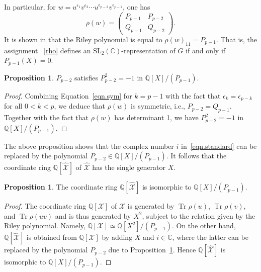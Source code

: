 \documentclass{amsart}
\newcommand{\Q}{\mathbb{Q}}
\newcommand{\C}{\mathbb{C}}
\newcommand{\SL}{\mathrm{SL}}
\newcommand{\calX}{\mathcal{X}}
\DeclareMathOperator{\Tr}{Tr}
\theoremstyle{definition}
\newtheorem{Proposition}[Theorem]{Proposition}
\begin{document}
In particular, for $w=u^{\epsilon_1}v^{\epsilon_2}\cdots u^{\epsilon_{p-2}} v^{\epsilon_{p-1}}$, one has
\begin{equation}
\label{eqn.w}
    \rho(w)=\begin{pmatrix} P_{p-1} & P_{p-2}\\ Q_{p-1} & Q_{p-2}\end{pmatrix}.
\end{equation}
It is shown in \cite{Riley} that the Riley polynomial is equal to $\rho(w)_{11} = P_{p-1}$. That is, the assignment~
\eqref{rho} defines an $\SL_2(\C)$-representation of $G$ if and only if $P_{p-1}(X)=0$. 

\begin{Proposition}
\label{prop.iota}
$P_{p-2}$ satisfies $P_{p-2}^2 = -1$ in $\Q[X]/(P_{p-1})$.
\end{Proposition}
\begin{proof}
Combining Equation~\eqref{eqn.sym} for $k=p-1$ with the fact that $\epsilon_k = \epsilon_{p-k}$ for all $0<k<p$, we deduce that $\rho(w)$ is symmetric, i.e., $P_{p-2}=Q_{p-1}$. Together with the fact that $\rho(w)$ has determinant 1, we have $P_{p-2}^2=-1$ in $\Q[X]/(P_{p-1})$. 
\end{proof}

The above proposition shows that the complex number $i$ in~\eqref{eqn.standard} can be replaced by the polynomial $P_{p-2}\in \Q[X]/(P_{p-1})$. It follows that the coordinate ring $\Q[\hat{\calX}]$ of $\hat{\calX}$ has the single generator $X$.
\begin{Proposition}
The coordinate ring $\Q[\hat{\calX}]$ is isomorphic to $\Q[X]/(P_{p-1})$.
\end{Proposition}
\begin{proof}
    The coordinate ring $\Q[\calX]$ of $\calX$ is generated by $\Tr \rho(u)$, $\Tr \rho(v)$, and $\Tr \rho(uv)$ and is thus generated by $X^2$, subject to the relation given by the Riley polynomial. Namely, $\Q[\calX] \simeq \Q[X^2]/(P_{p-1})$. On the other hand, $\Q[\hat{\calX}]$ is obtained from $\Q[\calX]$ by adding $X$ and $i \in \C$, where the latter can be replaced by the polynomial $P_{p-2}$ due to Proposition~\ref{prop.iota}. Hence $\Q[\hat{\calX}]$ is isomorphic to $\Q[X]/ (P_{p-1})$.
\end{proof}


\end{document}
